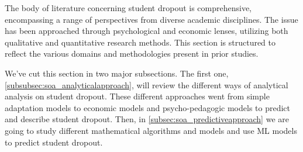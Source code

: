 \documentclass[../../main.tex]{subfiles}
\begin{document}
The body of literature concerning student dropout is comprehensive, encompassing a range of perspectives from diverse academic disciplines. The issue has been approached through psychological and economic lenses, utilizing both qualitative and quantitative research methods. This section is structured to reflect the various domains and methodologies present in prior studies.

We've cut this section in two major subsections. The first one, \ref{subsubsec:soa_analyticalapproach}, will review the different ways of analytical analysis on student dropout. These different approaches went from simple adaptation models to economic models and psycho-pedagogic models to predict and describe student dropout. Then, in \ref{subsec:soa_predictiveapproach} we are going to study different mathematical algorithms and models and use ML models to predict student dropout.
\end{document}
